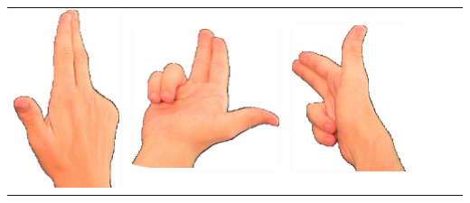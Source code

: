 \documentclass{article}
\begin{document}
\begin{center}
\begin{tabular}{r*{6}{c}}
\includegraphics[scale=0.1]{images/03-07-3.jpg}&
\includegraphics[scale=0.1]{images/03-07-4.jpg}&
\includegraphics[scale=0.1]{images/03-07-5.jpg}&

\end{tabular}
\end{center}
\end{document}
